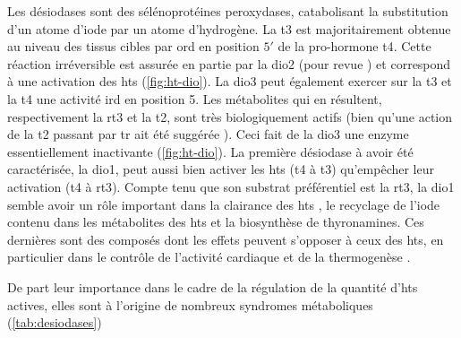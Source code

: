 \documentclass[../main.tex]{subfiles}
\begin{document}
Les désiodases sont des sélénoprotéines peroxydases, catabolisant la substitution d'un atome d'iode par un atome d'hydrogène.
La \gls{t3} est majoritairement obtenue au niveau des tissus cibles par \gls{ord} en position $5\prime$ de la pro-hormone \gls{t4}.
Cette réaction irréversible est assurée en partie par la \gls{dio2} (pour revue \citealp{Williams2011}) et correspond à une activation des \glspl{ht} (\autoref{fig:ht-dio}).
La \gls{dio3} peut également exercer sur la \gls{t3} et la \gls{t4} une activité \gls{ird} en position 5.
Les métabolites qui en résultent, respectivement la \gls{rt3} et la \gls{t2}, sont très biologiquement actifs (bien qu'une action de la \gls{t2} passant par \gls{tr} ait été suggérée \citealp{Mendoza2013}).
Ceci fait de la \gls{dio3} une enzyme essentiellement inactivante (\autoref{fig:ht-dio}).
La première désiodase à avoir été caractérisée, la \gls{dio1}, peut aussi bien activer les \glspl{ht} (\gls{t4} à \gls{t3}) qu'empêcher leur activation (\gls{t4} à \gls{rt3}).
Compte tenu que son substrat préférentiel est la \gls{rt3}, la \gls{dio1} semble avoir un rôle important dans la clairance des \glspl{ht} \citep{Maia2011}, le recyclage de l'iode contenu dans les métabolites des \glspl{ht} \citep{Schneider2006} et la biosynthèse de thyronamines.
Ces dernières sont des composés dont les effets peuvent s'opposer à ceux des \glspl{ht}, en particulier dans le contrôle de l'activité cardiaque et de la thermogenèse \citep{Scanlan2004}.
\par
De part leur importance dans le cadre de la régulation de la quantité d'\glspl{ht} actives, elles sont à l'origine de nombreux syndromes métaboliques (\autoref{tab:desiodases})


\end{document}
